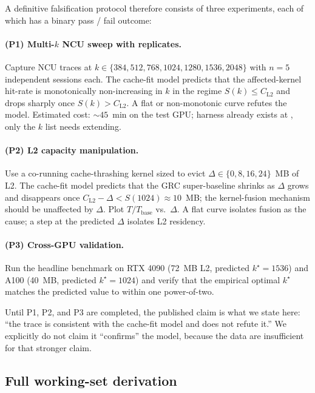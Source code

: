 \documentclass[11pt]{article}
\begin{document}
A definitive falsification protocol therefore consists of three
experiments, each of which has a binary pass / fail outcome:

\paragraph{(P1) Multi-$k$ NCU sweep with replicates.}
Capture NCU traces at $k\in\{384, 512, 768, 1024, 1280, 1536, 2048\}$
with $n{=}5$ independent sessions each. The cache-fit model predicts
that the affected-kernel hit-rate is monotonically non-increasing in $k$
in the regime $S(k)\le C_\text{L2}$ and drops sharply once
$S(k)>C_\text{L2}$. A flat or non-monotonic curve refutes the model.
Estimated cost: ${\sim}45$~min on the test GPU; harness already exists at
, only the $k$ list needs
extending.

\paragraph{(P2) L2 capacity manipulation.}
Use a co-running cache-thrashing kernel sized to evict $\Delta\in\{0,
8, 16, 24\}$~MB of L2. The cache-fit model predicts that the GRC
super-baseline shrinks as $\Delta$ grows and disappears once
$C_\text{L2}-\Delta < S(1024)\approx 10$~MB; the kernel-fusion
mechanism should be unaffected by $\Delta$. Plot $T/T_\text{base}$ vs.\
$\Delta$. A flat curve isolates fusion as the cause; a step at the
predicted $\Delta$ isolates L2 residency.

\paragraph{(P3) Cross-GPU validation.}
Run the headline benchmark on RTX 4090 (72~MB L2, predicted
$k^\star{=}1536$) and A100 (40~MB, predicted $k^\star{=}1024$) and
verify that the empirical optimal $k^\star$ matches the predicted
value to within one power-of-two.

Until P1, P2, and P3 are completed, the published claim is what we
state here: ``the trace is consistent with the cache-fit model and
does not refute it.'' We explicitly do not claim it ``confirms''
the model, because the data are insufficient for that stronger claim.

\subsection{Full working-set derivation}
\label{sec:workingset-math}
\end{document}
